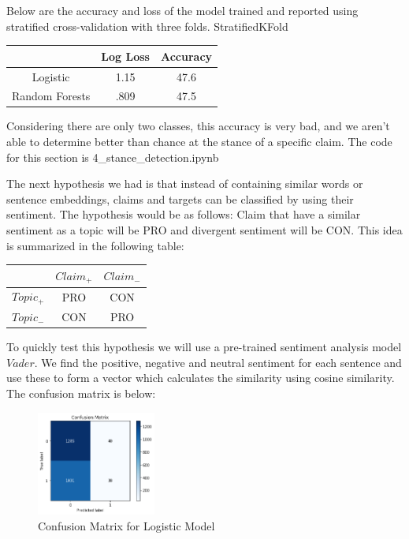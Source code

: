 \documentclass[11pt,a4paper]{article}
\begin{document}
Below are the accuracy and loss of the model trained and reported using stratified cross-validation with three folds.
StratifiedKFold
\begin{table}[H]
\begin{center}
\begin{tabular}{|c|c|c|}
\hline \bf & \bf Log Loss & \bf Accuracy \\ \hline
Logistic & 1.15 & 47.6 \\
Random Forests & .809 & 47.5 \\
\hline
\end{tabular}
\end{center}
\end{table}

Considering there are only two classes, this accuracy is very bad, and we aren't able to determine better than chance at the stance of a specific claim.  The code for this section is 4\_stance\_detection.ipynb

The next hypothesis we had is that instead of containing similar words or sentence embeddings, claims and targets can be classified by using their sentiment.  The hypothesis would be as follows:  Claim that have a similar sentiment as a topic will be PRO and divergent sentiment will be CON.  This idea is summarized in the following table:

\begin{table}[H]
\begin{center}
\begin{tabular}{|c|c|c|}
\hline \bf & \bf $Claim_{+}$ & \bf $Claim_{-}$ \\ \hline
$Topic_{+}$ & PRO & CON \\
$Topic_{-}$ & CON & PRO \\
\hline
\end{tabular}
\end{center}
\end{table}

To quickly test this hypothesis we will use a pre-trained sentiment analysis model $Vader$.  We find the positive, negative and neutral sentiment for each sentence and use these to form a vector which calculates the similarity using cosine similarity.  The confusion matrix is below:
\begin{figure}[H]
    \centering
    \includegraphics[width=0.35\textwidth]{sentiment_lr}
    \caption{\label{font-table} Confusion Matrix for Logistic Model }
\end{figure} 
\end{document}
